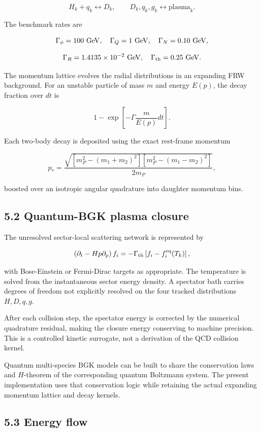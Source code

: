 \documentclass[
  10pt,
]{article}
\begin{document}
\[
H_k+q_k\leftrightarrow D_k,
\qquad
D_k,q_k,g_k\leftrightarrow\text{plasma}_k.
\]

The benchmark rates are

\[
\Gamma_\phi=100\ {\rm GeV},
\quad
\Gamma_Q=1\ {\rm GeV},
\quad
\Gamma_N=0.10\ {\rm GeV},
\]

\[
\Gamma_R=1.4135\times10^{-2}\ {\rm GeV},
\quad
\Gamma_{\rm th}=0.25\ {\rm GeV}.
\]

The momentum lattice evolves the radial distributions in an expanding
FRW background. For an unstable particle of mass \(m\) and energy
\(E(p)\), the decay fraction over \(dt\) is

\[
1-
\exp\left[-\Gamma\frac{m}{E(p)}dt\right].
\]

Each two-body decay is deposited using the exact rest-frame momentum

\[
p_*
=
\frac{
\sqrt{[m_P^2-(m_1+m_2)^2][m_P^2-(m_1-m_2)^2]}
}{2m_P},
\]

boosted over an isotropic angular quadrature into daughter momentum
bins.

\subsection{5.2 Quantum-BGK plasma
closure}\label{quantum-bgk-plasma-closure}

The unresolved sector-local scattering network is represented by

\[
\left(\partial_t-Hp\partial_p\right)f_i
=
-\Gamma_{\rm th}
\left[f_i-f_i^{\rm eq}(T_k)\right],
\]

with Bose-Einstein or Fermi-Dirac targets as appropriate. The
temperature is solved from the instantaneous sector energy density. A
spectator bath carries degrees of freedom not explicitly resolved on the
four tracked distributions \(H,D,q,g\).

After each collision step, the spectator energy is corrected by the
numerical quadrature residual, making the closure energy conserving to
machine precision. This is a controlled kinetic surrogate, not a
derivation of the QCD collision kernel.

Quantum multi-species BGK models can be built to share the conservation
laws and \(H\)-theorem of the corresponding quantum Boltzmann system.
The present implementation uses that conservation logic while retaining
the actual expanding momentum lattice and decay kernels.

\subsection{5.3 Energy flow}\label{energy-flow}
\end{document}
